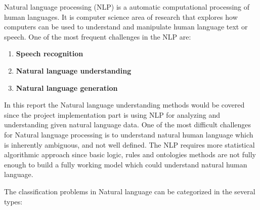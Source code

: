 Natural language processing (NLP) is a automatic computational processing of human languages. It is computer science area of research that explores how computers can be used to understand and manipulate human language text or speech. One of the most frequent challenges in the NLP are:
\begin{enumerate}
    \item \textbf{Speech recognition}
    \item \textbf{Natural language understanding}
    \item \textbf{Natural language generation}
\end{enumerate}

In this report the Natural language understanding methods would be covered since the project implementation part is using NLP for analyzing and understanding given natural language data. One of the most difficult challenges for Natural language processing is to understand natural human language which is inherently ambiguous, and not well defined. The NLP requires more statistical algorithmic approach since basic logic, rules and ontologies methods are not fully enough to build a fully working model which could understand natural human language.

The classification problems in Natural language can be categorized in the several types:

